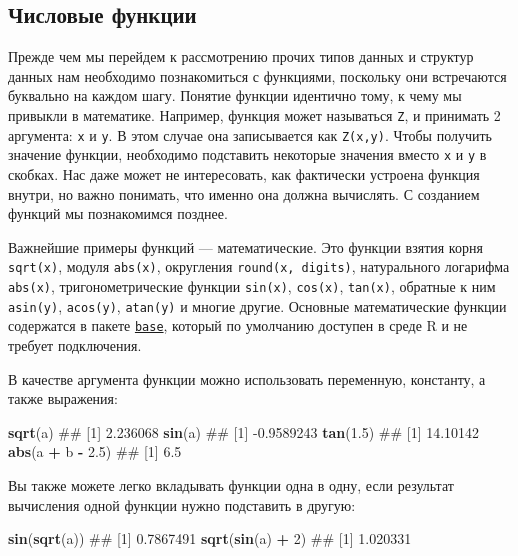 \documentclass[]{book}
\newenvironment{Shaded}{\begin{snugshade}}{\end{snugshade}}
\newcommand{\KeywordTok}[1]{\textcolor[rgb]{0.13,0.29,0.53}{\textbf{#1}}}
\newcommand{\DecValTok}[1]{\textcolor[rgb]{0.00,0.00,0.81}{#1}}
\newcommand{\FloatTok}[1]{\textcolor[rgb]{0.00,0.00,0.81}{#1}}
\newcommand{\StringTok}[1]{\textcolor[rgb]{0.31,0.60,0.02}{#1}}
\newcommand{\OperatorTok}[1]{\textcolor[rgb]{0.81,0.36,0.00}{\textbf{#1}}}
\newcommand{\NormalTok}[1]{#1}
\begin{document}
\subsection{Числовые функции}\label{number_functions}

Прежде чем мы перейдем к рассмотрению прочих типов данных и структур
данных нам необходимо познакомиться с функциями, поскольку они
встречаются буквально на каждом шагу. Понятие функции идентично тому, к
чему мы привыкли в математике. Например, функция может называться
\texttt{Z}, и принимать 2 аргумента: \texttt{x} и \texttt{y}. В этом
случае она записывается как \texttt{Z(x,y)}. Чтобы получить значение
функции, необходимо подставить некоторые значения вместо \texttt{x} и
\texttt{y} в скобках. Нас даже может не интересовать, как фактически
устроена функция внутри, но важно понимать, что именно она должна
вычислять. С созданием функций мы познакомимся позднее.

Важнейшие примеры функций --- математические. Это функции взятия корня
\texttt{sqrt(x)}, модуля \texttt{abs(x)}, округления
\texttt{round(x,\ digits)}, натурального логарифма \texttt{abs(x)},
тригонометрические функции \texttt{sin(x)}, \texttt{cos(x)},
\texttt{tan(x)}, обратные к ним \texttt{asin(y)}, \texttt{acos(y)},
\texttt{atan(y)} и многие другие. Основные математические функции
содержатся в пакете
\href{https://stat.ethz.ch/R-manual/R-devel/library/base/html/00Index.html}{\texttt{base}},
который по умолчанию доступен в среде R и не требует подключения.

В качестве аргумента функции можно использовать переменную, константу, а
также выражения:

\begin{Shaded}
\begin{Highlighting}[]
\KeywordTok{sqrt}\NormalTok{(a)}
\NormalTok{## [1] 2.236068}
\KeywordTok{sin}\NormalTok{(a)}
\NormalTok{## [1] -0.9589243}
\KeywordTok{tan}\NormalTok{(}\FloatTok{1.5}\NormalTok{)}
\NormalTok{## [1] 14.10142}
\KeywordTok{abs}\NormalTok{(a }\OperatorTok{+}\StringTok{ }\NormalTok{b }\OperatorTok{-}\StringTok{ }\FloatTok{2.5}\NormalTok{)}
\NormalTok{## [1] 6.5}
\end{Highlighting}
\end{Shaded}

Вы также можете легко вкладывать функции одна в одну, если результат
вычисления одной функции нужно подставить в другую:

\begin{Shaded}
\begin{Highlighting}[]
\KeywordTok{sin}\NormalTok{(}\KeywordTok{sqrt}\NormalTok{(a))}
\NormalTok{## [1] 0.7867491}
\KeywordTok{sqrt}\NormalTok{(}\KeywordTok{sin}\NormalTok{(a) }\OperatorTok{+}\StringTok{ }\DecValTok{2}\NormalTok{)}
\NormalTok{## [1] 1.020331}
\end{Highlighting}
\end{Shaded}
\end{document}
